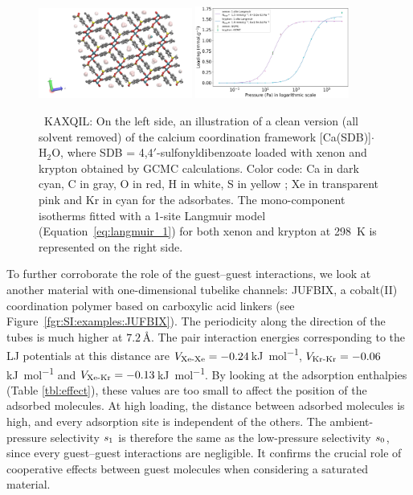 \documentclass[main.tex]{subfiles}
\begin{document}
\begin{figure}[h]
  \centering
    \includegraphics[width=0.45\textwidth]{figures/2-thermo/KAXQIL_clean.jpg}
    \includegraphics[width=0.45\textwidth]{figures/2-thermo/KAXQIL_clean_isotherm_xenon_krypton_298K.jpg}
    \caption{\ KAXQIL: On the left side, an illustration of a clean version (all solvent removed) of the calcium coordination framework [Ca(SDB)]$\cdot$H$_2$O, where SDB = 4,$4'$-sulfonyldibenzoate loaded with xenon and krypton obtained by GCMC calculations. Color code: Ca in dark cyan, C in gray, O in red, H in white, S in yellow ; Xe in transparent pink and Kr in cyan for the adsorbates. The mono-component isotherms fitted with a 1-site Langmuir model (Equation~\ref{eq:langmuir_1}) for both xenon and krypton at \SI{298}{\kelvin} is represented on the right side.}
    \label{fgr:SI:examples:KAXQIL}
  \end{figure}

To further corroborate the role of the guest--guest interactions, we look at another material with one-dimensional tubelike channels: JUFBIX, a cobalt(II) coordination polymer based on carboxylic acid linkers (see Figure~\ref{fgr:SI:examples:JUFBIX}).\cite{JUFBIX} The periodicity along the direction of the tubes is much higher at $7.2$\,\si{\angstrom}. The pair interaction energies corresponding to the LJ potentials at this distance are $V_{\text{Xe-Xe}}=-0.24$\,\si{\kilo\joule\per\mol}, $V_{\text{Kr-Kr}}=-0.06$\,\si{\kilo\joule\per\mol} and $V_{\text{Xe-Kr}}=-0.13$\,\si{\kilo\joule\per\mol}. By looking at the adsorption enthalpies (Table \ref{tbl:effect}), these values are too small to affect the position of the adsorbed molecules. At high loading, the distance between adsorbed molecules is high, and every adsorption site is independent of the others. The ambient-pressure selectivity $s_{\text{1}}$ is therefore the same as the low-pressure selectivity $s_{\text{0}}$, since every guest--guest interactions are negligible. It confirms the crucial role of cooperative effects between guest molecules when considering a saturated material.
\end{document}
